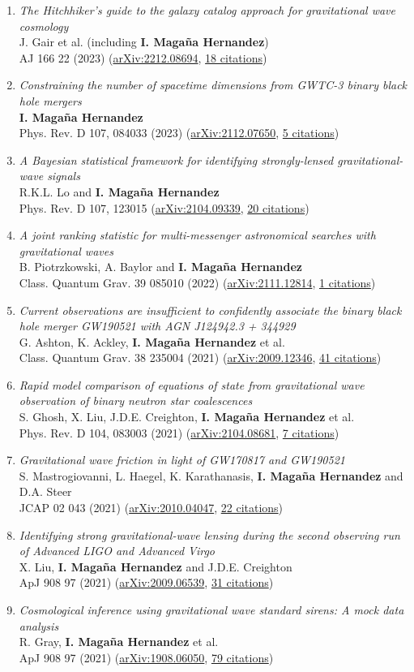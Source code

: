 \documentclass[letterpaper,10pt]{article}
\newcommand{\publicationJournal}[6]{
\begin{tabularx}
		\emph{#1} \\
		#2 \\
		#3 (\href{#4}{#5}, \underline{#6 citations})
\end{tabularx}\vspace{-3pt}}
\begin{document}
\begin{enumerate}
\item
    \publicationJournal{The Hitchhiker's guide to the galaxy catalog approach for gravitational wave cosmology}{J. Gair et al. (including \textbf{I. Maga\~na Hernandez})}{AJ 166 22 (2023)}{https://arxiv.org/abs/2212.08694}{arXiv:2212.08694}{18}
\item 
    \publicationJournal{Constraining the number of spacetime dimensions from GWTC-3 binary black hole mergers}{\textbf{I. Maga\~na Hernandez}}{Phys. Rev. D 107, 084033 (2023)}{https://arxiv.org/abs/2112.07650}{arXiv:2112.07650}{5}
\item 
    \publicationJournal{A Bayesian statistical framework for identifying strongly-lensed gravitational-wave signals}{R.K.L. Lo and \textbf{I. Maga\~na Hernandez}}{Phys. Rev. D 107, 123015 }{https://arxiv.org/abs/2104.09339}{arXiv:2104.09339}{20}
\item 
    \publicationJournal{A joint ranking statistic for multi-messenger astronomical searches with gravitational waves}{B. Piotrzkowski, A. Baylor and \textbf{I. Maga\~na Hernandez}}{Class. Quantum Grav. 39 085010 (2022)}{https://arxiv.org/abs/2111.12814}{arXiv:2111.12814}{1}
\item
    \publicationJournal{Current observations are insufficient to confidently associate the binary black hole merger GW190521 with AGN J124942.3 + 344929}{G. Ashton, K. Ackley, \textbf{I. Maga\~na Hernandez} et al.}{Class. Quantum Grav. 38 235004 (2021)}{https://arxiv.org/abs/2009.12346}{arXiv:2009.12346}{41}
\item
    \publicationJournal{Rapid model comparison of equations of state from gravitational wave observation of binary neutron star coalescences}{S. Ghosh, X. Liu, J.D.E. Creighton, \textbf{I. Maga\~na Hernandez} et al.}{Phys. Rev. D 104, 083003 (2021)}{https://arxiv.org/abs/2104.08681}{arXiv:2104.08681}{7}
\item
    \publicationJournal{Gravitational wave friction in light of GW170817 and GW190521}{S. Mastrogiovanni, L. Haegel, K. Karathanasis, \textbf{I. Maga\~na Hernandez} and D.A. Steer}{JCAP 02 043 (2021)}{https://arxiv.org/abs/2010.04047}{arXiv:2010.04047}{22}
\item
    \publicationJournal{Identifying strong gravitational-wave lensing during the second observing run of Advanced LIGO and Advanced Virgo}{X. Liu, \textbf{I. Maga\~na Hernandez} and J.D.E. Creighton}{ApJ 908 97 (2021)}{https://arxiv.org/abs/2009.06539}{arXiv:2009.06539}{31}
\item
    \publicationJournal{Cosmological inference using gravitational wave standard sirens: A mock data analysis}{R. Gray, \textbf{I. Maga\~na Hernandez} et al.}{ApJ 908 97 (2021)}{https://arxiv.org/abs/1908.06050}{arXiv:1908.06050}{79}

\end{enumerate}
\end{document}
